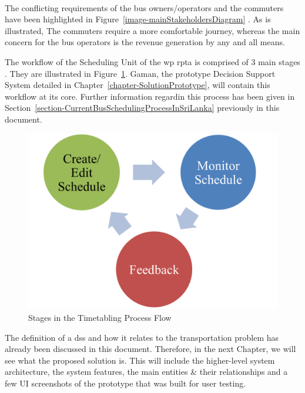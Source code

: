 \paragraph{} The conflicting requirements of the bus owners/operators and the commuters have been highlighted in Figure~\ref{image-mainStakeholdersDiagram} \cite{Mahesh2013a, Theja2013a, Mahesh2013b, Navaratne2013a, Navaratne2013b,  Ranjith2013a, Weerawardena2013, Piyadasa2013}. As is illustrated, The commuters require a more comfortable journey, whereas the main concern for the bus operators is the revenue generation by any and all means.

The workflow of the Scheduling Unit of the \acrshort{wp} \acrshort{rpta} is comprised of 3 main stages  \cite{Mahesh2013a, Theja2013a, Mahesh2013b, Ranjith2013a, Piyadasa2013}. They are illustrated in Figure~\ref{image-timetablingProcessSteps}. Gaman, the prototype Decision Support System detailed in Chapter~\ref{chapter-SolutionPrototype}, will contain this workflow at its core. Further information regardin this process has been given in Section~\ref{section-CurrentBusSchedulingProcessInSriLanka} previously in this document.

\begin {figure} [H]
\centering
\includegraphics[scale=0.7]{timetablingProcessSteps}
\caption [Stages in the Timetabling Process Flow] {Stages in the Timetabling Process Flow}
\label {image-timetablingProcessSteps}
\end {figure}

The definition of a \acrshort{dss} and how it relates to the transportation problem has already been discussed in this document. Therefore, in the next Chapter, we will see what the proposed solution is. This will include the higher-level system architecture, the system features, the main entities \& their relationships and a few UI screenshots of the prototype that was built for user testing.



